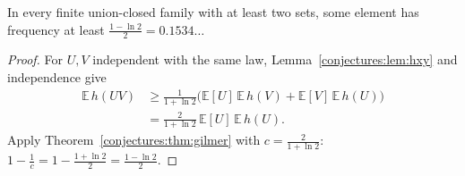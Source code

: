 \begin{corollary}\label{conjectures:cor:ucconst}
In every finite union-closed family with at least two sets, some element has frequency at least $\frac{1-\ln2}2=0.1534\ldots$
\end{corollary}
\begin{proof}
For $U,V$ independent with the same law, Lemma~\ref{conjectures:lem:hxy} and independence give
\[
\begin{aligned}\mathbb E\,h(UV)&\ge\frac1{1+\ln2}\bigl(\mathbb E[U]\,\mathbb E\,h(V)+\mathbb E[V]\,\mathbb E\,h(U)\bigr)\\&=\frac2{1+\ln2}\,\mathbb E[U]\,\mathbb E\,h(U).\end{aligned}
\]
Apply
Theorem~\ref{conjectures:thm:gilmer} with $c=\frac2{1+\ln2}$: $1-\frac1c=1-\frac{1+\ln2}2=\frac{1-\ln2}2$.
\end{proof}
